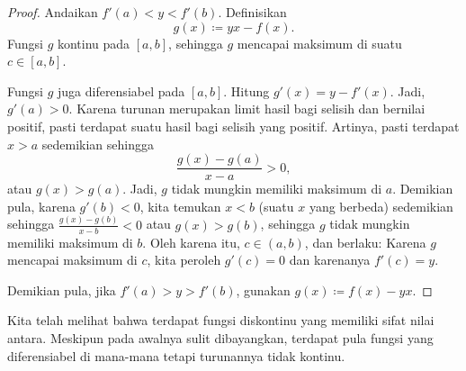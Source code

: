 \begin{proof}
Andaikan
$f'(a) < y < f'(b)$.
Definisikan
\begin{equation*}
g(x) \coloneqq yx - f(x) .
\end{equation*}
Fungsi $g$ kontinu pada $[a,b]$, sehingga $g$ mencapai maksimum di suatu $c \in
[a,b]$.

Fungsi $g$ juga diferensiabel pada $[a,b]$.
Hitung $g'(x) = y-f'(x)$.  Jadi, $g'(a) > 0$.  Karena turunan merupakan
limit hasil bagi selisih dan bernilai positif, pasti terdapat suatu
hasil bagi selisih yang positif.  Artinya, pasti terdapat
$x > a$ sedemikian sehingga
\begin{equation*}
\frac{g(x)-g(a)}{x-a} > 0 ,
\end{equation*}
atau $g(x) > g(a)$.  Jadi, $g$
tidak mungkin memiliki maksimum di $a$.  Demikian pula, karena $g'(b) < 0$,
kita temukan $x < b$ (suatu $x$ yang berbeda) sedemikian sehingga
$\frac{g(x)-g(b)}{x-b} < 0$ atau $g(x) > g(b)$, sehingga
$g$ tidak mungkin memiliki maksimum di $b$.
Oleh karena itu, $c \in (a,b)$,
dan  berlaku: Karena $g$ mencapai maksimum
di $c$, kita peroleh $g'(c) = 0$
dan karenanya $f'(c) = y$.

Demikian pula, jika $f'(a) > y > f'(b)$, gunakan $g(x) \coloneqq f(x)- yx$.
\end{proof}

Kita telah melihat bahwa
terdapat fungsi diskontinu yang memiliki
sifat nilai antara.  Meskipun pada awalnya sulit dibayangkan,
terdapat pula fungsi yang diferensiabel di mana-mana tetapi turunannya tidak
kontinu.

